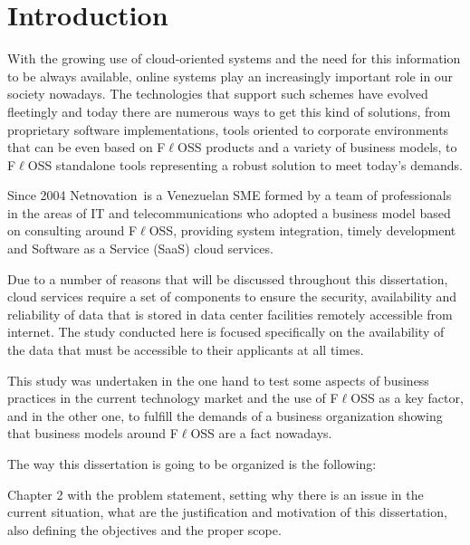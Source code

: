 \documentclass[a4paper, 12pt]{book}
\begin{document}
%
\tableofcontents  	%
\listoffigures  	%
\listoftables 		%

%
\chapter{Introduction}
\label{chap:introduction}

\noindent With the growing use of cloud-oriented systems and the need for this information to be always available, online systems play an increasingly important role in our society nowadays. The technologies that support such schemes have evolved fleetingly and today there are numerous ways to get this kind of solutions, from proprietary software implementations, tools oriented to corporate environments that can be even based on F$\ell$OSS products and a variety of business models, to F$\ell$OSS standalone tools representing a robust solution to meet today's demands.\bigskip

\noindent Since 2004 Netnovation\texttrademark \ is a Venezuelan SME formed by a team of professionals in the areas of IT and telecommunications who adopted a business model based on consulting around F$\ell$OSS, providing system integration, timely development and Software as a Service (SaaS) cloud services.\bigskip

\noindent Due to a number of reasons that will be discussed throughout this dissertation, cloud services require a set of components to ensure the security, availability and reliability of data that is stored in data center facilities remotely accessible from internet. The study conducted here is focused specifically on the availability of the data that must be accessible to their applicants at all times.\bigskip

\noindent This study was undertaken in the one hand to test some aspects of business practices in the current technology market and the use of F$\ell$OSS as a key factor, and in the other one, to fulfill the demands of a business organization showing that business models around F$\ell$OSS are a fact nowadays.\bigskip

\noindent The way this dissertation is going to be organized is the following:\bigskip

\noindent Chapter 2 with the problem statement, setting why there is an issue in the current situation, what are the justification and motivation of this dissertation, also defining the objectives and the proper scope.\bigskip
\end{document}

